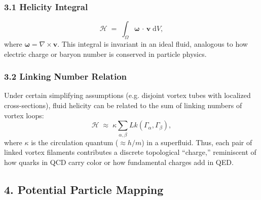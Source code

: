 \subsubsection*{3.1 Helicity Integral}

\[
    \mathcal{H}
    \;=\;
    \int_{\Omega}
    \boldsymbol{\omega}\,\cdot\,\mathbf{v}\;\mathrm{d}V,
\]
where \(\boldsymbol{\omega} = \nabla \times \mathbf{v}\). This integral is invariant in an ideal fluid, analogous to how electric charge or baryon number is conserved in particle physics.

\subsubsection*{3.2 Linking Number Relation}

Under certain simplifying assumptions (e.g. disjoint vortex tubes with localized cross-sections), fluid helicity can be related to the sum of linking numbers of vortex loops:
\[
    \mathcal{H}
    \;\approx\;
    \kappa
    \sum_{\alpha,\beta} Lk(\Gamma_\alpha, \Gamma_\beta),
\]
where \(\kappa\) is the circulation quantum (\(\approx h/m\)) in a superfluid. Thus, each pair of linked vortex filaments contributes a discrete topological “charge,” reminiscent of how quarks in QCD carry color or how fundamental charges add in QED.

\subsection*{4. Potential Particle Mapping}

